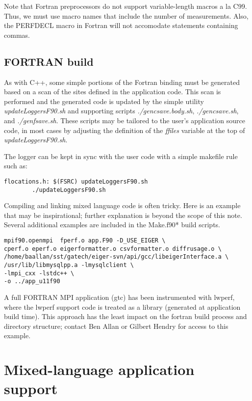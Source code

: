 \documentclass{article}
\begin{document}
Note that Fortran preprocessors do not support variable-length macros a la C99. Thus, we must use macro names that include the number of measurements. Also, the PERFDECL macro in Fortran will not
accomodate statements containing commas.

\subsection{FORTRAN build}
\label{sec:fbuild}
As with C++, some simple portions of the Fortran binding must be generated based on a scan of the sites defined in the application code. This scan is performed and the generated code is updated by the simple utility {\em updateLoggersF90.sh} and supporting scripts {\em ./gencsave.body.sh}, {\em ./gencsave.sh}, and {\em ./genfsave.sh}. These scripts may be tailored to the user's application source code, in most cases by adjusting the definition of the {\em ffiles} variable at the top of {\em updateLoggersF90.sh}.

The logger can be kept in sync with the user code with a simple makefile rule such as:
\begin{verbatim}
flocations.h: $(FSRC) updateLoggersF90.sh
        ./updateLoggersF90.sh
\end{verbatim}

Compiling and linking mixed language code is often tricky. Here is an example that may be inspirational; further explanation is beyond the scope of this note. Several additional examples are included in the Make.f90* build scripts.

\begin{verbatim}
mpif90.openmpi  fperf.o app.F90 -D_USE_EIGER \
cperf.o eperf.o eigerformatter.o csvformatter.o diffrusage.o \
/home/baallan/sst/gatech/eiger-svn/api/gcc/libeigerInterface.a \
/usr/lib/libmysqlpp.a -lmysqlclient \
-lmpi_cxx -lstdc++ \
-o ../app_u11f90
\end{verbatim}

A full FORTRAN MPI application (gtc) has been instrumented with lwperf, where the lwperf support code is treated as a library (generated at application build time). This approach has the least impact on the fortran build process and directory structure; contact Ben Allan or Gilbert Hendry for access to this example.


\section{Mixed-language application support}
\end{document}
